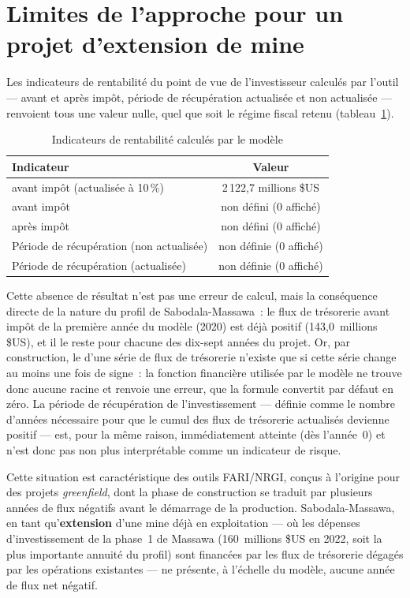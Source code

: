 \section{Limites de l'approche pour un projet d'extension de mine}
\label{sec:limites-tri}

Les indicateurs de rentabilité du point de vue de l'investisseur calculés par l'outil --- \TRI{} avant et après impôt, période de récupération actualisée et non actualisée --- renvoient tous une valeur nulle, quel que soit le régime fiscal retenu (tableau~\ref{tab:tri}).

\begin{table}[H]
\centering
\caption{Indicateurs de rentabilité calculés par le modèle}
\label{tab:tri}
\begin{tabular}{lc}
\toprule
Indicateur & Valeur \\
\midrule
\VAN{} avant impôt (actualisée à 10\,\%) & 2\,122,7 millions \$US \\
\TRI{} avant impôt & non défini (0 affiché) \\
\TRI{} après impôt & non défini (0 affiché) \\
Période de récupération (non actualisée) & non définie (0 affiché) \\
Période de récupération (actualisée) & non définie (0 affiché) \\
\bottomrule
\end{tabular}
\end{table}

Cette absence de résultat n'est pas une erreur de calcul, mais la conséquence directe de la nature du profil de Sabodala-Massawa~: le flux de trésorerie avant impôt de la première année du modèle (2020) est déjà positif (143,0~millions \$US), et il le reste pour chacune des dix-sept années du projet. Or, par construction, le \TRI{} d'une série de flux de trésorerie n'existe que si cette série change au moins une fois de signe~: la fonction financière utilisée par le modèle ne trouve donc aucune racine et renvoie une erreur, que la formule convertit par défaut en zéro. La période de récupération de l'investissement --- définie comme le nombre d'années nécessaire pour que le cumul des flux de trésorerie actualisés devienne positif --- est, pour la même raison, immédiatement atteinte (dès l'année~0) et n'est donc pas non plus interprétable comme un indicateur de risque.

Cette situation est caractéristique des outils FARI/NRGI, conçus à l'origine pour des projets \emph{greenfield}, dont la phase de construction se traduit par plusieurs années de flux négatifs avant le démarrage de la production. Sabodala-Massawa, en tant qu'\textbf{extension} d'une mine déjà en exploitation --- où les dépenses d'investissement de la phase~1 de Massawa (160~millions \$US en 2022, soit la plus importante annuité du profil) sont financées par les flux de trésorerie dégagés par les opérations existantes --- ne présente, à l'échelle du modèle, aucune année de flux net négatif.

